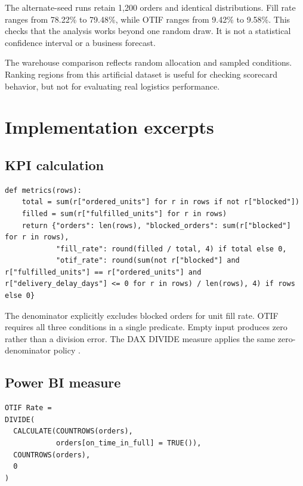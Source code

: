 \documentclass[conference,letterpaper]{IEEEtran}
\begin{document}
The alternate-seed runs retain 1,200 orders and identical distributions. Fill rate ranges from 78.22\% to 79.48\%, while OTIF ranges from 9.42\% to 9.58\%. This checks that the analysis works beyond one random draw. It is not a statistical confidence interval or a business forecast.


The warehouse comparison reflects random allocation and sampled conditions. Ranking regions from this artificial dataset is useful for checking scorecard behavior, but not for evaluating real logistics performance.


\section{Implementation excerpts}

\subsection{KPI calculation}

\noindent\begin{minipage}{\columnwidth}
\begin{lstlisting}
def metrics(rows):
    total = sum(r["ordered_units"] for r in rows if not r["blocked"])
    filled = sum(r["fulfilled_units"] for r in rows)
    return {"orders": len(rows), "blocked_orders": sum(r["blocked"] for r in rows),
            "fill_rate": round(filled / total, 4) if total else 0,
            "otif_rate": round(sum(not r["blocked"] and r["fulfilled_units"] == r["ordered_units"] and r["delivery_delay_days"] <= 0 for r in rows) / len(rows), 4) if rows else 0}

\end{lstlisting}
\end{minipage}


The denominator explicitly excludes blocked orders for unit fill rate. OTIF requires all three conditions in a single predicate. Empty input produces zero rather than a division error. The DAX DIVIDE measure applies the same zero-denominator policy \cite{r6}.


\subsection{Power BI measure}

\noindent\begin{minipage}{\columnwidth}
\begin{lstlisting}
OTIF Rate =
DIVIDE(
  CALCULATE(COUNTROWS(orders),
            orders[on_time_in_full] = TRUE()),
  COUNTROWS(orders),
  0
)
\end{lstlisting}
\end{minipage}
\end{document}
